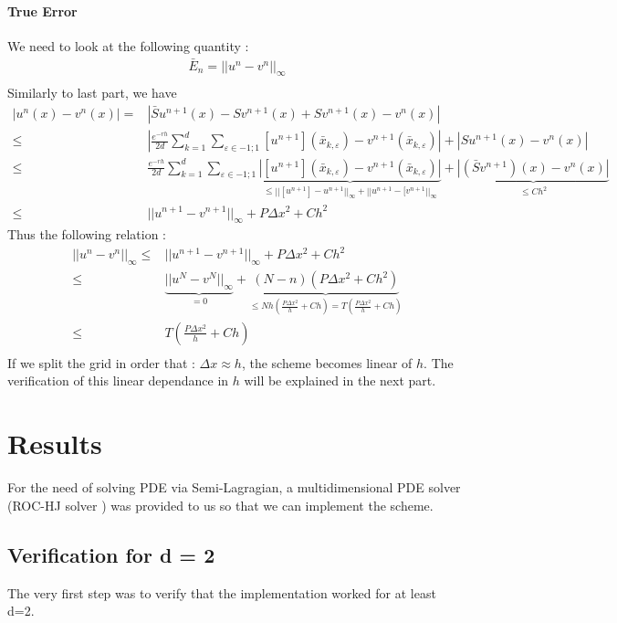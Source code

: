 \documentclass[a4paper,10pt]{article}
\begin{document}
\paragraph{True Error} We need to look at the following quantity : 
 \begin{align*}
 \bar{E}_n=||u^n-v^n||_\infty\\
 \end{align*}
 Similarly to last part, we have 
\begin{equation}
 \begin{split}
 |u^n(x)-v^n(x)| 
 =&|\bar{S}u^{n+1}(x)-Sv^{n+1}(x)+Sv^{n+1}(x)-v^n(x)|\\
 \leq & 
 		|\frac{e^{-rh}}{2d}\sum_{k=1}^d 		\sum_{\varepsilon \in {-1;1}} [u^{n+1}](\bar{x}_{k,\varepsilon})-v^{n+1}(\bar{x}_{k,\varepsilon}) |+|Su^{n+1}(x)-v^n(x)|\\
  \leq&   
 		\frac{e^{-rh}}{2d}\sum_{k=1}^d 		\sum_{\varepsilon \in {-1;1}} \underbrace{|[u^{n+1}](\bar{x}_{k,\varepsilon})-v^{n+1}(\bar{x}_{k,\varepsilon}) |}_{ \leq||[u^{n+1}]-u^{n+1}||_\infty+||u^{n+1}-[v^{n+1}||_\infty}+\underbrace{|(\bar{S}v^{n+1})(x)-v^n(x)|}_{\leq Ch^2}\\
 \leq&  ||u^{n+1}-v^{n+1}||_\infty+P\Delta x^2 + Ch^2
\end{split}
\end{equation}
Thus the following relation :
  \begin{equation}
 \begin{split}
 ||u^{n}-v^{n}||_\infty \leq&||u^{n+1}-v^{n+1}||_\infty+P\Delta x^2+Ch^2\\
 \leq&\underbrace{||u^{N}-v^{N}||_\infty}_{=0} + \underbrace{(N-n)(P\Delta x^2+Ch^2)}_{\leq Nh(\frac{P\Delta x^2}{h}+Ch)= T(\frac{P\Delta x^2}{h}+Ch)}\\
 \leq& T(\frac{P\Delta x^2}{h}+Ch) \\
 \end{split}
 \end{equation}
If we split the grid in order that : $\Delta x \approx h$, the scheme becomes linear of $h$. The verification of this linear dependance in $h$ will be explained in the next part.
\section{Results}
For the need of solving PDE via Semi-Lagragian, a multidimensional PDE solver (ROC-HJ solver \cite{BokanowskiLib}) was provided to us so that we can implement the scheme.
\subsection{Verification for d = 2} 
The very first step was to verify that the implementation worked for at least d=2. 
\end{document}
